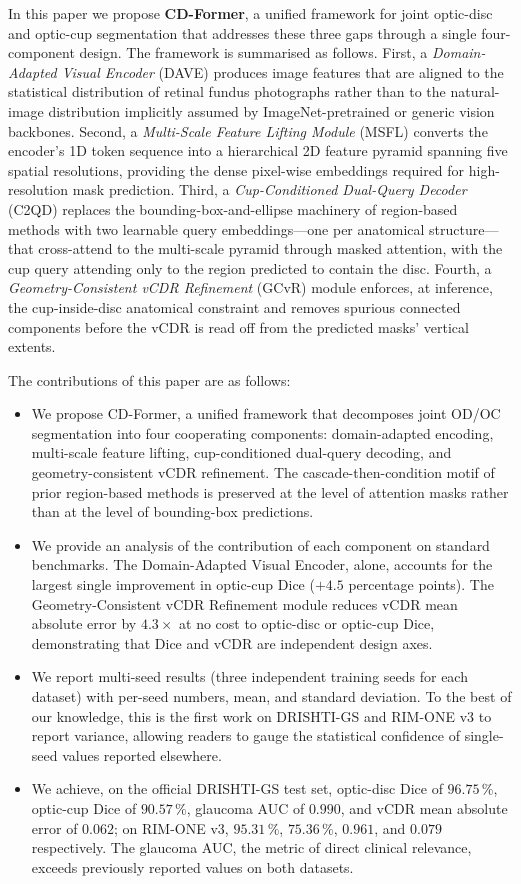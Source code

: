 \documentclass[10pt,journal,twocolumn]{IEEEtran}
\begin{document}
In this paper we propose \textbf{CD-Former}, a unified framework for joint optic-disc and optic-cup segmentation that addresses these three gaps through a single four-component design. The framework is summarised as follows. First, a \emph{Domain-Adapted Visual Encoder} (DAVE) produces image features that are aligned to the statistical distribution of retinal fundus photographs rather than to the natural-image distribution implicitly assumed by ImageNet-pretrained or generic vision backbones. Second, a \emph{Multi-Scale Feature Lifting Module} (MSFL) converts the encoder's 1D token sequence into a hierarchical 2D feature pyramid spanning five spatial resolutions, providing the dense pixel-wise embeddings required for high-resolution mask prediction. Third, a \emph{Cup-Conditioned Dual-Query Decoder} (C2QD) replaces the bounding-box-and-ellipse machinery of region-based methods with two learnable query embeddings---one per anatomical structure---that cross-attend to the multi-scale pyramid through masked attention, with the cup query attending only to the region predicted to contain the disc. Fourth, a \emph{Geometry-Consistent vCDR Refinement} (GCvR) module enforces, at inference, the cup-inside-disc anatomical constraint and removes spurious connected components before the vCDR is read off from the predicted masks' vertical extents.

The contributions of this paper are as follows:
\begin{itemize}
  \item We propose CD-Former, a unified framework that decomposes joint OD/OC segmentation into four cooperating components: domain-adapted encoding, multi-scale feature lifting, cup-conditioned dual-query decoding, and geometry-consistent vCDR refinement. The cascade-then-condition motif of prior region-based methods is preserved at the level of attention masks rather than at the level of bounding-box predictions.
  \item We provide an analysis of the contribution of each component on standard benchmarks. The Domain-Adapted Visual Encoder, alone, accounts for the largest single improvement in optic-cup Dice ($+4.5$ percentage points). The Geometry-Consistent vCDR Refinement module reduces vCDR mean absolute error by $4.3\times$ at no cost to optic-disc or optic-cup Dice, demonstrating that Dice and vCDR are independent design axes.
  \item We report multi-seed results (three independent training seeds for each dataset) with per-seed numbers, mean, and standard deviation. To the best of our knowledge, this is the first work on DRISHTI-GS and RIM-ONE v3 to report variance, allowing readers to gauge the statistical confidence of single-seed values reported elsewhere.
  \item We achieve, on the official DRISHTI-GS test set, optic-disc Dice of $96.75\,\%$, optic-cup Dice of $90.57\,\%$, glaucoma AUC of $0.990$, and vCDR mean absolute error of $0.062$; on RIM-ONE v3, $95.31\,\%$, $75.36\,\%$, $0.961$, and $0.079$ respectively. The glaucoma AUC, the metric of direct clinical relevance, exceeds previously reported values on both datasets.
\end{itemize}
\end{document}
